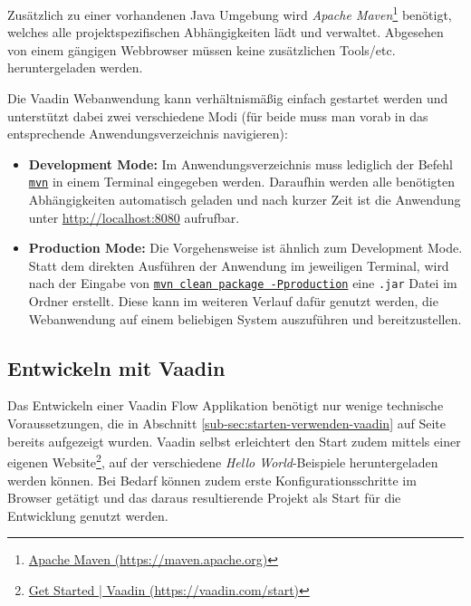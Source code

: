 \documentclass[a4paper,12pt,twoside]{scrreprt}
\begin{document}
Zusätzlich zu einer vorhandenen Java Umgebung wird \textit{Apache Maven}\footnote{\href{https://maven.apache.org/}{Apache Maven (https://maven.apache.org)}} benötigt, welches alle projektspezifischen Abhängigkeiten lädt und verwaltet. Abgesehen von einem gängigen Webbrowser müssen keine zusätzlichen Tools/etc. heruntergeladen werden.

\medskip

Die Vaadin Webanwendung kann verhältnismäßig einfach gestartet werden und unterstützt dabei zwei verschiedene Modi (für beide muss man vorab in das entsprechende Anwendungsverzeichnis navigieren):

\begin{itemize}
    \item \textbf{Development Mode:} Im Anwendungsverzeichnis  muss lediglich der Befehl \underline{\texttt{mvn}} in einem Terminal eingegeben werden. Daraufhin werden alle benötigten Abhängigkeiten automatisch geladen und nach kurzer Zeit ist die Anwendung unter \url{http://localhost:8080} aufrufbar.
    \item \textbf{Production Mode:} Die Vorgehensweise ist ähnlich zum Development Mode. Statt dem direkten Ausführen der Anwendung im jeweiligen Terminal, wird nach der Eingabe von \underline{\texttt{mvn clean package -Pproduction}} eine \texttt{.jar} Datei im Ordner  erstellt. Diese kann im weiteren Verlauf dafür genutzt werden, die Webanwendung auf einem beliebigen System auszuführen und bereitzustellen.
\end{itemize}

\subsection{Entwickeln mit Vaadin}
\label{sub-sec:entwickeln-vaadin}
Das Entwickeln einer Vaadin Flow Applikation benötigt nur wenige technische Voraussetzungen, die in Abschnitt \ref{sub-sec:starten-verwenden-vaadin} auf Seite \pageref{sub-sec:starten-verwenden-vaadin} bereits aufgezeigt wurden. Vaadin selbst erleichtert den Start zudem mittels einer eigenen Website\footnote{\href{https://vaadin.com/start}{Get Started | Vaadin (https://vaadin.com/start)}}, auf der verschiedene \textit{Hello World}-Beispiele heruntergeladen werden können. Bei Bedarf können zudem erste Konfigurationsschritte im Browser getätigt und das daraus resultierende Projekt als Start für die Entwicklung genutzt werden.

\medskip
\end{document}
